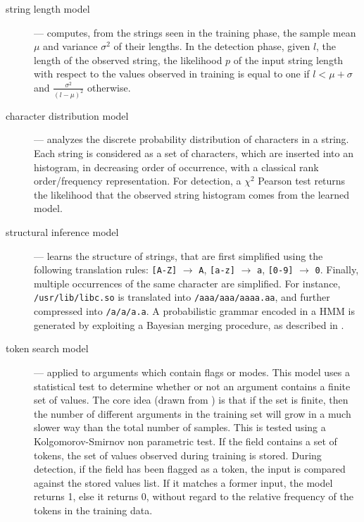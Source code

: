 \begin{description}

\item [string length model] --- computes, from the strings seen in the
  training phase, the sample mean $\mu$ and variance $\sigma^2$ of
  their lengths. In the detection phase, given $l$, the length of the
  observed string, the likelihood $p$ of the input string length with
  respect to the values observed in training is equal to one if $l <
  \mu + \sigma$ and $\frac{\sigma^2}{(l-\mu)^2}$ otherwise.

\item [character distribution model] --- analyzes the discrete
  probability distribution of characters in a string. Each string is
  considered as a set of characters, which are inserted into an
  histogram, in decreasing order of occurrence, with a classical rank
  order/frequency representation. For detection, a $\chi^2$ Pearson
  test returns the likelihood that the observed string histogram comes
  from the learned model.

\item [structural inference model] --- learns the structure of
  strings, that are first simplified using the following translation
  rules: \texttt{[A-Z]} $\to$ \texttt{A}, \texttt{[a-z]} $\to$
  \texttt{a}, \texttt{[0-9]} $\to$ \texttt{0}. Finally, multiple
  occurrences of the same character are simplified. For instance,
  \texttt{/usr\-/lib\-/libc\-.so} is translated into
  \texttt{/aaa\-/aaa\-/aaaa\-.aa}, and further compressed into
  \texttt{/a/a/a.a}. A probabilistic grammar encoded in a
  \acf{HMM} is generated by exploiting a Bayesian merging
  procedure, as described in
  \citep{stolcke93hidden,stolcke:icsi1994:merging,InducingProbabilisticGrammarsMerging}.
  
\item [token search model] --- applied to arguments which contain
  flags or modes. This model uses a statistical test to determine
  whether or not an argument contains a finite set of values. The core
  idea (drawn from \citep{lee-learning}) is that if the set is finite,
  then the number of different arguments in the training set will grow
  in a much slower way than the total number of samples. This is
  tested using a Kolgomorov-Smirnov non parametric test. If the field
  contains a set of tokens, the set of values observed during training
  is stored. During detection, if the field has been flagged as a
  token, the input is compared against the stored values list. If it
  matches a former input, the model returns 1, else it returns 0,
  without regard to the relative frequency of the tokens in the
  training data.
\end{description}

